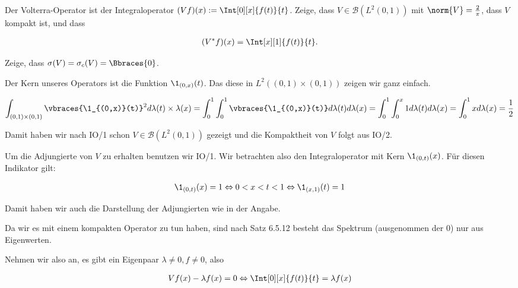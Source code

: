 \begin{exercise}[IO/3]

Der Volterra-Operator ist der Integraloperator $(V f)(x) := \Int[0][x]{f(t)}{t}$.
Zeige, dass $V \in \mathcal{B}(L^2(0, 1))$ mit $\norm{V} = \frac{2}{\pi}$, dass $V$ kompakt ist, und dass

\begin{align*}
  (V^\ast f)(x)
  =
  \Int[x][1]{f(t)}{t}.
\end{align*}

Zeige, dass $\sigma(V) = \sigma_c(V) = \Bbraces{0}$.

\end{exercise}

\begin{solution}

Der Kern unseres Operators ist die Funktion $\1_{(0,x)}(t)$.
Das diese in $L^2((0,1) \times (0,1))$ zeigen wir ganz einfach.

\begin{align*}
  \int_{(0,1) \times (0,1)} \vbraces{\1_{(0,x)}(t)}^2 d\lambda(t) \times \lambda(x)
  =
  \int_0^1 \int_0^1 \vbraces{\1_{(0,x)}(t)} d\lambda(t) d\lambda(x)
  =
  \int_0^1 \int_0^x 1 d\lambda(t) d\lambda(x)
  =
  \int_0^1 x d\lambda(x)
  =
  \frac{1}{2}
\end{align*}

Damit haben wir nach IO/1 schon $V \in \mathcal{B}(L^2(0, 1))$ gezeigt und die
Kompaktheit von $V$ folgt aus IO/2.

Um die Adjungierte von $V$ zu erhalten benutzen wir IO/1. Wir betrachten also den
Integraloperator mit Kern $\1_{(0,t)}(x)$. Für diesen Indikator gilt:

\begin{align*}
  \1_{(0,t)}(x) = 1
  \Leftrightarrow
  0 < x < t < 1
  \Leftrightarrow
  \1_{(x,1)}(t) = 1
\end{align*}

Damit haben wir auch die Darstellung der Adjungierten wie in der Angabe.

Da wir es mit einem kompakten Operator zu tun haben, sind nach Satz 6.5.12 besteht
das Spektrum (ausgenommen der $0$) nur aus Eigenwerten.

Nehmen wir also an, es gibt ein Eigenpaar $\lambda \neq 0, f \neq 0$, also

\begin{align*}
  Vf(x) - \lambda f(x) = 0
  \Leftrightarrow
  \Int[0][x]{f(t)}{t} = \lambda f(x)
\end{align*}


\end{solution}
